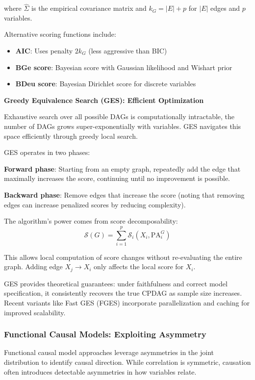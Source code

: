 where $\hat{\Sigma}$ is the empirical covariance matrix and $k_G = |E| + p$ for $|E|$ edges and $p$ variables.

Alternative scoring functions include:
\begin{itemize}
\item \textbf{AIC}: Uses penalty $2k_G$ (less aggressive than BIC)
\item \textbf{BGe score}: Bayesian score with Gaussian likelihood and Wishart prior
\item \textbf{BDeu score}: Bayesian Dirichlet score for discrete variables
\end{itemize}

\textbf{Greedy Equivalence Search (GES): Efficient Optimization}

Exhaustive search over all possible DAGs is computationally intractable, the number of DAGs grows super-exponentially with variables. GES navigates this space efficiently through greedy local search.

GES operates in two phases:

\textbf{Forward phase}: Starting from an empty graph, repeatedly add the edge that maximally increases the score, continuing until no improvement is possible.

\textbf{Backward phase}: Remove edges that increase the score (noting that removing edges can increase penalized scores by reducing complexity).

The algorithm's power comes from score decomposability:
\begin{equation}
\mathcal{S}(G) = \sum_{i=1}^{p} \mathcal{S}_i(X_i, \text{PA}_i^G)
\end{equation}

This allows local computation of score changes without re-evaluating the entire graph. Adding edge $X_j \rightarrow X_i$ only affects the local score for $X_i$.

GES provides theoretical guarantees: under faithfulness and correct model specification, it consistently recovers the true CPDAG as sample size increases. Recent variants like Fast GES (FGES) incorporate parallelization and caching for improved scalability.

\subsubsection{Functional Causal Models: Exploiting Asymmetry}

Functional causal model approaches leverage asymmetries in the joint distribution to identify causal direction. While correlation is symmetric, causation often introduces detectable asymmetries in how variables relate.

